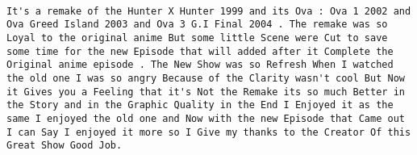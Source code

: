 \documentclass[
]{article}
\begin{document}
\begin{verbatim}
                                                                                                                                                                                                                                                                                                                                                                                                                                                                                                                                                                                                                                                                                                                                                                                                                                                                                                                                                                                                               It's a remake of the Hunter X Hunter 1999 and its Ova : Ova 1 2002 and Ova Greed Island 2003 and Ova 3 G.I Final 2004 . The remake was so Loyal to the original anime But some little Scene were Cut to save some time for the new Episode that will added after it Complete the Original anime episode . The New Show was so Refresh When I watched the old one I was so angry Because of the Clarity wasn't cool But Now it Gives you a Feeling that it's Not the Remake its so much Better in the Story and in the Graphic Quality in the End I Enjoyed it as the same I enjoyed the old one and Now with the new Episode that Came out I can Say I enjoyed it more so I Give my thanks to the Creator Of this Great Show Good Job.

\end{verbatim}
\end{document}
